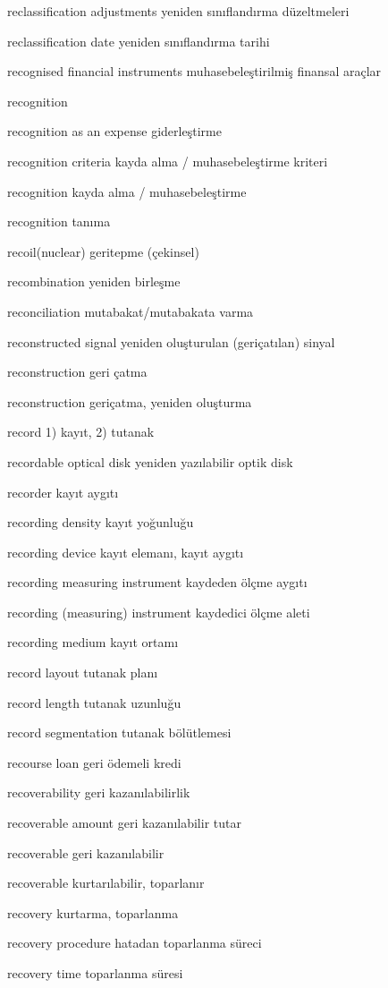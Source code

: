 \documentclass[12pt,fleqn]{article}\usepackage{../../common}
\begin{document}
reclassification adjustments yeniden sınıflandırma düzeltmeleri

reclassification date yeniden sınıflandırma tarihi

recognised financial instruments muhasebeleştirilmiş finansal araçlar

recognition

recognition as an expense giderleştirme

recognition criteria kayda alma / muhasebeleştirme kriteri

recognition kayda alma / muhasebeleştirme

recognition tanıma

recoil(nuclear) geritepme (çekinsel)

recombination yeniden birleşme

reconciliation mutabakat/mutabakata varma

reconstructed signal yeniden oluşturulan (geriçatılan) sinyal

reconstruction geri çatma

reconstruction geriçatma, yeniden oluşturma

record 1) kayıt, 2) tutanak

recordable optical disk yeniden yazılabilir optik disk

recorder kayıt aygıtı

recording density kayıt yoğunluğu

recording device kayıt elemanı, kayıt aygıtı

recording measuring instrument kaydeden ölçme aygıtı

recording (measuring) instrument kaydedici ölçme aleti

recording medium kayıt ortamı

record layout tutanak planı

record length tutanak uzunluğu

record segmentation tutanak bölütlemesi

recourse loan geri ödemeli kredi

recoverability geri kazanılabilirlik

recoverable amount geri kazanılabilir tutar

recoverable geri kazanılabilir

recoverable kurtarılabilir, toparlanır

recovery kurtarma, toparlanma

recovery procedure hatadan toparlanma süreci

recovery time toparlanma süresi
\end{document}
